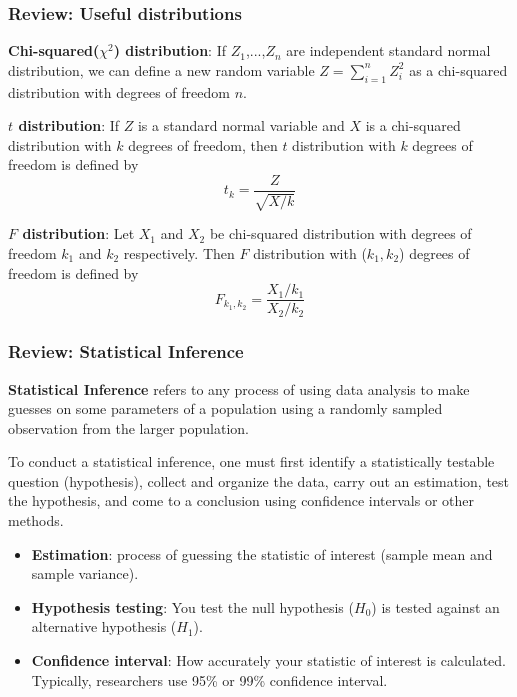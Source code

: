 \documentclass[compress]{beamer}
\newenvironment{wideitemize}{\itemize\addtolength{\itemsep}{10pt}}{\enditemize}
\begin{document}
\begin{frame}
\frametitle{Review: Useful distributions}
\begin{wideitemize}
\item \textbf{Chi-squared($\chi^2$) distribution}: If $Z_1$,...,$Z_n$ are independent standard normal distribution, we can define a new random variable $Z=\sum_{i=1}^n Z_i^2$ as a chi-squared distribution with degrees of freedom $n$.  
\item \textbf{$t$ distribution}: If $Z$ is a standard normal variable and $X$ is a chi-squared distribution with $k$ degrees of freedom, then $t$ distribution with $k$ degrees of freedom is defined by
\[
t_k=\frac{Z}{\sqrt{X/k}}
\]
\item \textbf{$F$ distribution}: Let $X_1$ and $X_2$ be chi-squared distribution with degrees of freedom $k_1$ and $k_2$ respectively. Then $F$ distribution with ($k_1,k_2$) degrees of freedom is defined by
\[
F_{k_1,k_2}=\frac{X_1/k_1}{X_2/k_2}
\]

\end{wideitemize}
\end{frame}

\begin{frame}
\frametitle{Review: Statistical Inference}
\begin{wideitemize}
\item\textbf{Statistical Inference} refers to any process of using data analysis to make guesses on some parameters of a population using a randomly sampled observation from the larger population. 
\item To conduct a statistical inference, one must first identify a statistically testable question (hypothesis), collect and organize the data, carry out an estimation, test the hypothesis, and come to a conclusion using confidence intervals or other methods.
\begin{itemize}
\item \textbf{Estimation}: process of guessing the statistic of interest (sample mean and sample variance). 
\item \textbf{Hypothesis testing}: You test the null hypothesis ($H_0$) is tested against an alternative hypothesis ($H_1$).  
\item \textbf{Confidence interval}: How accurately your statistic of interest is calculated. Typically, researchers use 95\% or 99\% confidence interval.
\end{itemize}
\end{wideitemize}
\end{frame}
\end{document}
